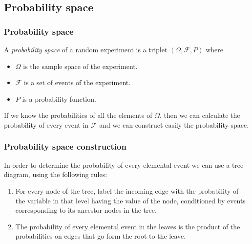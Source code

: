 \subsection{Probability space}

\begin{frame}
\frametitle{Probability space}
\begin{definition}
A \emph{probability space} of a random experiment is a triplet $(\Omega,\mathcal{F},P)$ where
\begin{itemize}
\item $\Omega$ is the sample space of the experiment.
\item $\mathcal{F}$ is a set of events of the experiment.
\item $P$ is a probability function. 
\end{itemize} 
\end{definition}

If we know the probabilities of all the elements of $\Omega$, then we can calculate the probability of every event in $\mathcal{F}$ and we can construct easily the probability space. 
\end{frame}


\begin{frame}
\frametitle{Probability space construction}
In order to determine the probability of every elemental event we can use a tree diagram, using the following rules:
\begin{enumerate}
\item For every node of the tree, label the incoming edge with the probability of the variable in that level having the value of the node, conditioned by events corresponding to its ancestor nodes in the tree.
\item The probability of every elemental event in the leaves is the product of the probabilities on edges
that go form the root to the leave.
\end{enumerate}
\begin{center}
\end{center}
\end{frame}


